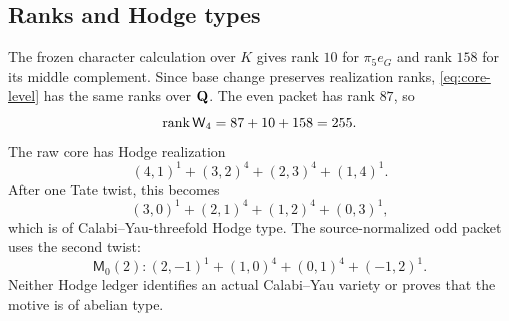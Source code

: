 \subsection{Ranks and Hodge types}

The frozen character calculation over \(K\) gives rank \(10\) for
\(\pi_5e_G\) and rank \(158\) for its middle complement.  Since base
change preserves realization ranks, \eqref{eq:core-level} has the same
ranks over \(\mathbf Q\).  The even packet has rank \(87\), so
\[
\operatorname{rank}\mathsf W_4=87+10+158=255.
\]
The raw core has Hodge realization
\[
(4,1)^1+(3,2)^4+(2,3)^4+(1,4)^1.
\]
After one Tate twist, this becomes
\[
(3,0)^1+(2,1)^4+(1,2)^4+(0,3)^1,
\]
which is of Calabi--Yau-threefold Hodge type.  The source-normalized odd
packet uses the second twist:
\[
\mathsf M_0(2):
(2,-1)^1+(1,0)^4+(0,1)^4+(-1,2)^1.
\]
Neither Hodge ledger identifies an actual Calabi--Yau variety or proves
that the motive is of abelian type.
